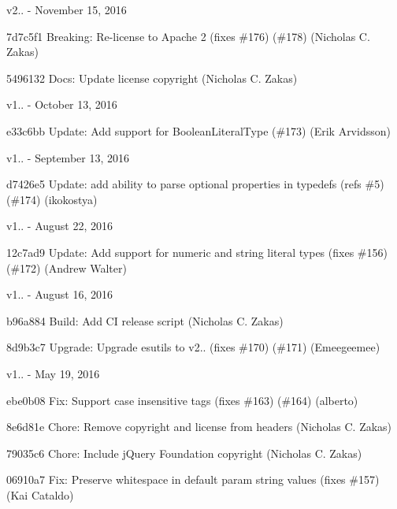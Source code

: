 v2.. -\/ November 15, 2016


\begin{DoxyItemize}
\item 7d7c5f1 Breaking\+: Re-\/license to Apache 2 (fixes \#176) (\#178) (Nicholas C. Zakas)
\item 5496132 Docs\+: Update license copyright (Nicholas C. Zakas)
\end{DoxyItemize}

v1.. -\/ October 13, 2016


\begin{DoxyItemize}
\item e33c6bb Update\+: Add support for Boolean\+Literal\+Type (\#173) (Erik Arvidsson)
\end{DoxyItemize}

v1.. -\/ September 13, 2016


\begin{DoxyItemize}
\item d7426e5 Update\+: add ability to parse optional properties in typedefs (refs \#5) (\#174) (ikokostya)
\end{DoxyItemize}

v1.. -\/ August 22, 2016


\begin{DoxyItemize}
\item 12c7ad9 Update\+: Add support for numeric and string literal types (fixes \#156) (\#172) (Andrew Walter)
\end{DoxyItemize}

v1.. -\/ August 16, 2016


\begin{DoxyItemize}
\item b96a884 Build\+: Add CI release script (Nicholas C. Zakas)
\item 8d9b3c7 Upgrade\+: Upgrade esutils to v2.. (fixes \#170) (\#171) (Emeegeemee)
\end{DoxyItemize}

v1.. -\/ May 19, 2016


\begin{DoxyItemize}
\item ebe0b08 Fix\+: Support case insensitive tags (fixes \#163) (\#164) (alberto)
\item 8e6d81e Chore\+: Remove copyright and license from headers (Nicholas C. Zakas)
\item 79035c6 Chore\+: Include j\+Query Foundation copyright (Nicholas C. Zakas)
\item 06910a7 Fix\+: Preserve whitespace in default param string values (fixes \#157) (Kai Cataldo)
\end{DoxyItemize}

